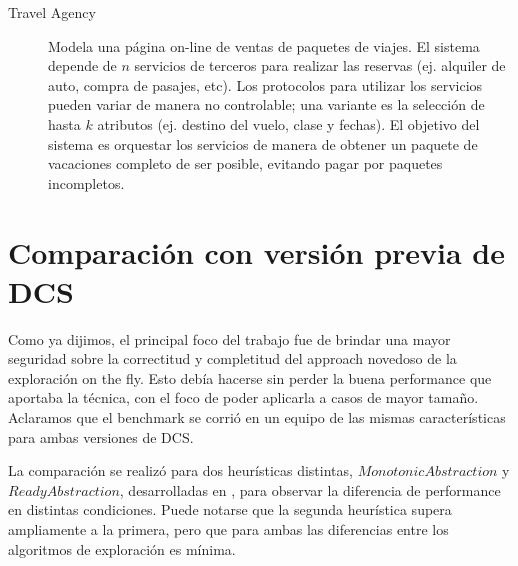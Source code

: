 \begin{description}
    \item [Travel Agency] Modela una página on-line de ventas de paquetes de viajes. El sistema depende de $n$ servicios de terceros para realizar las reservas (ej. alquiler de auto, compra de pasajes, etc). Los protocolos para utilizar los servicios pueden variar de manera no controlable; una variante es la selección de hasta $k$ atributos (ej. destino del vuelo, clase y fechas). El objetivo del sistema es orquestar los servicios de manera de obtener un paquete de vacaciones completo de ser posible, evitando pagar por paquetes incompletos.
\end{description}

\section{Comparación con versión previa de DCS}
Como ya dijimos, el principal foco del trabajo fue de brindar una mayor seguridad sobre la correctitud y completitud del approach novedoso de la exploración on the fly. Esto debía hacerse sin perder la buena performance que aportaba la técnica, con el foco de poder aplicarla a casos de mayor tamaño. Aclaramos que el benchmark se corrió en un equipo de las mismas características para ambas versiones de DCS.

La comparación se realizó para dos heurísticas distintas, $Monotonic Abstraction$ y $Ready Abstraction$, desarrolladas en \cite{tesisDani}, para observar la diferencia de performance en distintas condiciones. Puede notarse que la segunda heurística supera ampliamente a la primera, pero que para ambas las diferencias entre los algoritmos de exploración es mínima.

